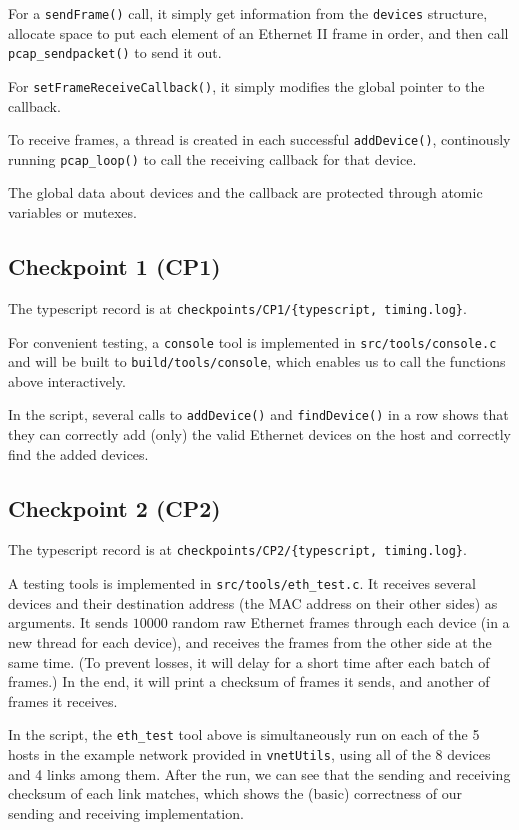 \documentclass[a4paper]{article}
\begin{document}
  For a \texttt{sendFrame()} call, it simply get information from the \texttt{devices} structure, allocate space to put each element of an Ethernet II frame in order, and then call \texttt{pcap\_sendpacket()} to send it out.

  For \texttt{setFrameReceiveCallback()}, it simply modifies the global pointer to the callback.

  To receive frames, a thread is created in each successful \texttt{addDevice()}, continously running \texttt{pcap\_loop()} to call the receiving callback for that device.

  The global data about devices and the callback are protected through atomic variables or mutexes.

  \subsection{Checkpoint 1 (CP1)}
  
  The typescript record is at \texttt{checkpoints/CP1/\{typescript, timing.log\}}.

  For convenient testing, a \texttt{console} tool is implemented in \texttt{src/tools/console.c} and will be built to \texttt{build/tools/console}, which enables us to call the functions above interactively.

  In the script, several calls to \texttt{addDevice()} and \texttt{findDevice()} in a row shows that they can correctly add (only) the valid Ethernet devices on the host and correctly find the added devices.

  \subsection{Checkpoint 2 (CP2)}

  The typescript record is at \texttt{checkpoints/CP2/\{typescript, timing.log\}}.

  A testing tools is implemented in \texttt{src/tools/eth\_test.c}.
  It receives several devices and their destination address (the MAC address on their other sides) as arguments.
  It sends $10000$ random raw Ethernet frames through each device (in a new thread for each device), and receives the frames from the other side at the same time.
  (To prevent losses, it will delay for a short time after each batch of frames.)
  In the end, it will print a checksum of frames it sends, and another of frames it receives.

  In the script, the \texttt{eth\_test} tool above is simultaneously run on each of the 5 hosts in the example network provided in \texttt{vnetUtils}, using all of the 8 devices and 4 links among them.
  After the run, we can see that the sending and receiving checksum of each link matches, which shows the (basic) correctness of our sending and receiving implementation.
\end{document}
